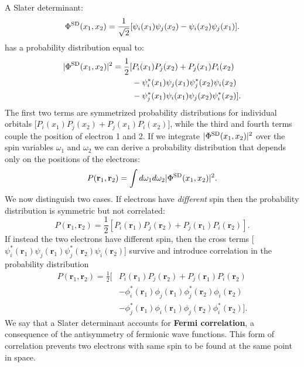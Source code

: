 \documentclass[../Main/chem532-notes.tex]{subfiles}
\begin{document}
\begin{example}
A Slater determinant:
\begin{equation}
\Phi^{\rm SD}(x_1,x_2) = \frac{1}{\sqrt{2}} [ \psi_i(x_1) \psi_j(x_2) - \psi_i(x_2) \psi_j(x_1)].
\end{equation}
has a probability distribution equal to:
\begin{equation}
\begin{split}
|\Phi^{\rm SD}(x_1,x_2)|^2 = \frac{1}{2} [&
P_i(x_1) P_j(x_2) +  P_j(x_1) P_i(x_2) \\
&-  \psi_i^*(x_1)\psi_j(x_1)  \psi_j^*(x_2) \psi_i(x_2)\\
&- \psi_j^*(x_1)\psi_i(x_1) \psi_j(x_2) \psi_i^*(x_2)  
].
\end{split}
\end{equation}
The first two terms are symmetrized probability distributions for individual orbitals [$P_i(x_1) P_j(x_2) +  P_j(x_1) P_i(x_2)$], while the third and fourth terms couple the position of electron 1 and 2.
If we integrate $|\Phi^{\rm SD}(x_1,x_2)|^2$ over the spin variables $\omega_1$ and $\omega_2$ we can derive a probability distribution that depends only on the positions of the electrons:
\begin{equation}
P(\mathbf{r}_1,\mathbf{r}_2) =
\int d\omega_1 d\omega_2 |\Phi^{\rm SD}(x_1,x_2)|^2.
\end{equation}
We now distinguish two cases.
If electrons have \textit{different} spin then the probability distribution is symmetric but not correlated:
\begin{equation}
P(\mathbf{r}_1,\mathbf{r}_2) = \frac{1}{2} [
P_i(\mathbf{r}_1) P_j(\mathbf{r}_2) +  P_j(\mathbf{r}_1) P_i(\mathbf{r}_2) ].
\end{equation}
If instead the two electrons have different spin, then the cross terms [$\psi_i^*(\mathbf{r}_1)\psi_j(\mathbf{r}_1)  \psi_j^*(\mathbf{r}_2) \psi_i(\mathbf{r}_2)$] survive and introduce correlation in the probability distribution
\begin{equation}
\begin{split}
P(\mathbf{r}_1,\mathbf{r}_2) = \frac{1}{2} [&
P_i(\mathbf{r}_1) P_j(\mathbf{r}_2) +  P_j(\mathbf{r}_1) P_i(\mathbf{r}_2) \\
&-  \phi_i^*(\mathbf{r}_1)\phi_j(\mathbf{r}_1)  \phi_j^*(\mathbf{r}_2) \phi_i(\mathbf{r}_2)\\
&- \phi_j^*(\mathbf{r}_1)\phi_i(\mathbf{r}_1) \phi_j(\mathbf{r}_2) \phi_i^*(\mathbf{r}_2)].
\end{split}
\end{equation}
We say that a Slater determinant accounts for \textbf{Fermi correlation}, a consequence of the antisymmetry of fermionic wave functions.
This form of correlation prevents two electrons with same spin to be found at the same point in space.
\end{example}
\end{document}
